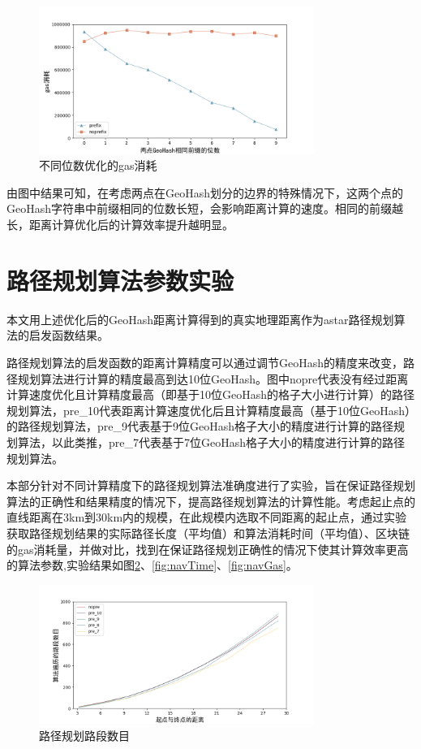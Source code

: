 \begin{figure}[h]
  \centering
  \includegraphics[height=0.3\textheight,width=0.8\textwidth]{figures/不同位数优化gas}
  \caption{不同位数优化的gas消耗}\label{fig:diffBetterGas}
\end{figure}

由图中结果可知，在考虑两点在GeoHash划分的边界的特殊情况下，这两个点的GeoHash字符串中前缀相同的位数长短，会影响距离计算的速度。相同的前缀越长，距离计算优化后的计算效率提升越明显。

\section{路径规划算法参数实验}
本文用上述优化后的GeoHash距离计算得到的真实地理距离作为astar路径规划算法的启发函数结果。

路径规划算法的启发函数的距离计算精度可以通过调节GeoHash的精度来改变，路径规划算法进行计算的精度最高到达10位GeoHash。图中nopre代表没有经过距离计算速度优化且计算精度最高（即基于10位GeoHash的格子大小进行计算）的路径规划算法，pre\_10代表距离计算速度优化后且计算精度最高（基于10位GeoHash）的路径规划算法，pre\_9代表基于9位GeoHash格子大小的精度进行计算的路径规划算法，以此类推，pre\_7代表基于7位GeoHash格子大小的精度进行计算的路径规划算法。

本部分针对不同计算精度下的路径规划算法准确度进行了实验，旨在保证路径规划算法的正确性和结果精度的情况下，提高路径规划算法的计算性能。考虑起止点的直线距离在3km到30km内的规模，在此规模内选取不同距离的起止点，通过实验获取路径规划结果的实际路径长度（平均值）和算法消耗时间（平均值）、区块链的gas消耗量，并做对比，找到在保证路径规划正确性的情况下使其计算效率更高的算法参数,实验结果如图\ref{fig:navRoads}、\ref{fig:navTime}、\ref{fig:navGas}。

\begin{figure}[h]
  \centering
  \includegraphics[height=0.3\textheight,width=0.8\textwidth]{figures/路径规划路段数目}
  \caption{路径规划路段数目}\label{fig:navRoads}
\end{figure}

